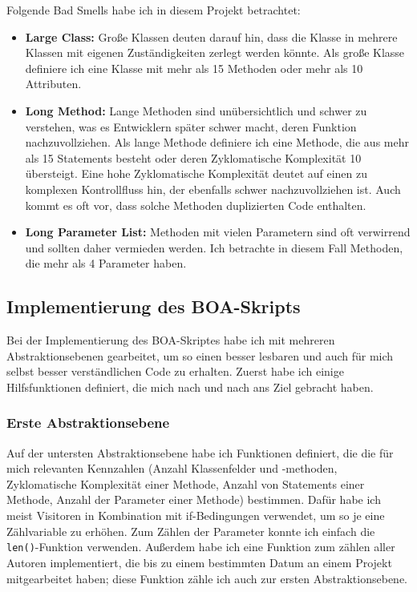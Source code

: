 \documentclass[12pt]{article}
\begin{document}
Folgende Bad Smells habe ich in diesem Projekt betrachtet:
\begin{itemize}
	\item \textbf{Large Class:} Große Klassen deuten darauf hin, dass die Klasse in mehrere Klassen mit eigenen Zuständigkeiten zerlegt werden könnte. \cite{fowler2018refactoring}
	Als große Klasse definiere ich eine Klasse mit mehr als 15 Methoden oder mehr als 10 Attributen.
	
	\item \textbf{Long Method:} Lange Methoden sind unübersichtlich und schwer zu verstehen, was es Entwicklern später schwer macht, deren Funktion nachzuvollziehen. \cite{fowler2018refactoring}
	Als lange Methode definiere ich eine Methode, die aus mehr als 15 Statements besteht oder deren Zyklomatische Komplexität 10 übersteigt.
	Eine hohe Zyklomatische Komplexität deutet auf einen zu komplexen Kontrollfluss hin, der ebenfalls schwer nachzuvollziehen ist.
	Auch kommt es oft vor, dass solche Methoden duplizierten Code enthalten. \cite{fowler2018refactoring}
	
	\item \textbf{Long Parameter List:} Methoden mit vielen Parametern sind oft verwirrend und sollten daher vermieden werden. \cite{fowler2018refactoring}
	Ich betrachte in diesem Fall Methoden, die mehr als 4 Parameter haben.
\end{itemize}

\subsection{Implementierung des BOA-Skripts}
Bei der Implementierung des BOA-Skriptes habe ich mit mehreren Abstraktionsebenen gearbeitet, um so einen besser lesbaren und auch für mich selbst besser verständlichen Code zu erhalten.
Zuerst habe ich einige Hilfsfunktionen definiert, die mich nach und nach ans Ziel gebracht haben.

\subsubsection{Erste Abstraktionsebene}
Auf der untersten Abstraktionsebene habe ich Funktionen definiert, die die für mich relevanten Kennzahlen (Anzahl Klassenfelder und -methoden, Zyklomatische Komplexität einer Methode, Anzahl von Statements einer Methode, Anzahl der Parameter einer Methode) bestimmen.
Dafür habe ich meist Visitoren in Kombination mit if-Bedingungen verwendet, um so je eine Zählvariable zu erhöhen.
Zum Zählen der Parameter konnte ich einfach die \texttt{len()}-Funktion verwenden.
Außerdem habe ich eine Funktion zum zählen aller Autoren implementiert, die bis zu einem bestimmten Datum an einem Projekt mitgearbeitet haben; diese Funktion zähle ich auch zur ersten Abstraktionsebene.
\end{document}
